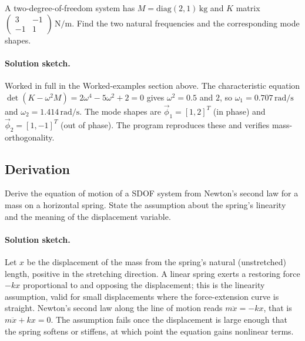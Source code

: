 \begin{exercise}\label{ex:vol03ch06:2dof}
A two-degree-of-freedom system has $M = \text{diag}(2, 1)\,\si{
\kilogram}$ and $K$ matrix $\begin{pmatrix} 3 & -1 \\ -1 & 1
\end{pmatrix}\,\si{\newton\per\meter}$. Find the two natural
frequencies and the corresponding mode shapes.

\paragraph{Solution sketch.} Worked in full in the Worked-examples
section above. The characteristic equation $\det(K - \omega^2 M) =
2\omega^4 - 5\omega^2 + 2 = 0$ gives $\omega^2 = 0.5$ and $2$, so
$\omega_1 = 0.707\,\si{\radian\per\second}$ and $\omega_2 = 1.414\,\si{
\radian\per\second}$. The mode shapes are $\vec{\phi}_1 = [1, 2]^T$
(in phase) and $\vec{\phi}_2 = [1, -1]^T$ (out of phase). The program
 reproduces these and verifies
mass-orthogonality.
\end{exercise}

\subsection*{Derivation}

\begin{exercise}
Derive the equation of motion of a SDOF system from Newton's second
law for a mass on a horizontal spring. State the assumption about
the spring's linearity and the meaning of the displacement variable.

\paragraph{Solution sketch.} Let $x$ be the displacement of the mass
from the spring's natural (unstretched) length, positive in the
stretching direction. A linear spring exerts a restoring force
$-kx$ proportional to and opposing the displacement; this is the
linearity assumption, valid for small displacements where the
force-extension curve is straight. Newton's second law along the line
of motion reads $m\ddot{x} = -kx$, that is $m\ddot{x} + kx = 0$. The
assumption fails once the displacement is large enough that the spring
softens or stiffens, at which point the equation gains nonlinear
terms.
\end{exercise}

